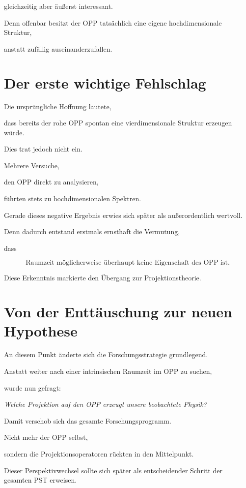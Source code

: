 gleichzeitig aber äußerst interessant.

Denn offenbar besitzt der OPP tatsächlich eine eigene hochdimensionale Struktur,

anstatt zufällig auseinanderzufallen.

\section*{Der erste wichtige Fehlschlag}

Die ursprüngliche Hoffnung lautete,

dass bereits der rohe OPP spontan eine vierdimensionale Struktur erzeugen würde.

Dies trat jedoch nicht ein.

Mehrere Versuche,

den OPP direkt zu analysieren,

führten stets zu hochdimensionalen Spektren.

Gerade dieses negative Ergebnis erwies sich später als außerordentlich wertvoll.

Denn dadurch entstand erstmals ernsthaft die Vermutung,

dass

\[
\boxed{
\text{Raumzeit möglicherweise überhaupt keine Eigenschaft des OPP ist.}
}
\]

Diese Erkenntnis markierte den Übergang zur Projektionstheorie.

\section*{Von der Enttäuschung zur neuen Hypothese}

An diesem Punkt änderte sich die Forschungsstrategie grundlegend.

Anstatt weiter nach einer intrinsischen Raumzeit im OPP zu suchen,

wurde nun gefragt:

\begin{center}
\emph{Welche Projektion auf den OPP erzeugt unsere beobachtete Physik?}
\end{center}

Damit verschob sich das gesamte Forschungsprogramm.

Nicht mehr der OPP selbst,

sondern die Projektionsoperatoren rückten in den Mittelpunkt.

Dieser Perspektivwechsel sollte sich später als entscheidender Schritt der gesamten PST erweisen.

